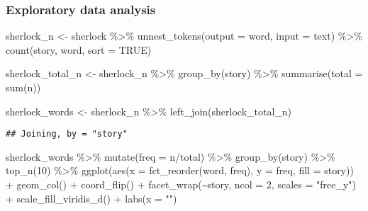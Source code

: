\documentclass[
]{book}
\newenvironment{Shaded}{\begin{snugshade}}{\end{snugshade}}
\newcommand{\AttributeTok}[1]{\textcolor[rgb]{0.77,0.63,0.00}{#1}}
\newcommand{\ConstantTok}[1]{\textcolor[rgb]{0.00,0.00,0.00}{#1}}
\newcommand{\DecValTok}[1]{\textcolor[rgb]{0.00,0.00,0.81}{#1}}
\newcommand{\FunctionTok}[1]{\textcolor[rgb]{0.00,0.00,0.00}{#1}}
\newcommand{\NormalTok}[1]{#1}
\newcommand{\OtherTok}[1]{\textcolor[rgb]{0.56,0.35,0.01}{#1}}
\newcommand{\SpecialCharTok}[1]{\textcolor[rgb]{0.00,0.00,0.00}{#1}}
\newcommand{\StringTok}[1]{\textcolor[rgb]{0.31,0.60,0.02}{#1}}
\begin{document}
\hypertarget{exploratory-data-analysis}{%
\subsubsection{Exploratory data analysis}\label{exploratory-data-analysis}}

\begin{Shaded}
\begin{Highlighting}[]
\NormalTok{sherlock\_n }\OtherTok{\textless{}{-}}\NormalTok{ sherlock }\SpecialCharTok{\%\textgreater{}\%}
  \FunctionTok{unnest\_tokens}\NormalTok{(}\AttributeTok{output =}\NormalTok{ word,}
                \AttributeTok{input =}\NormalTok{ text) }\SpecialCharTok{\%\textgreater{}\%}
  \FunctionTok{count}\NormalTok{(story, word, }\AttributeTok{sort =} \ConstantTok{TRUE}\NormalTok{)}

\NormalTok{sherlock\_total\_n }\OtherTok{\textless{}{-}}\NormalTok{ sherlock\_n }\SpecialCharTok{\%\textgreater{}\%}
  \FunctionTok{group\_by}\NormalTok{(story) }\SpecialCharTok{\%\textgreater{}\%}
  \FunctionTok{summarise}\NormalTok{(}\AttributeTok{total =} \FunctionTok{sum}\NormalTok{(n))}

\NormalTok{sherlock\_words }\OtherTok{\textless{}{-}}\NormalTok{ sherlock\_n }\SpecialCharTok{\%\textgreater{}\%} \FunctionTok{left\_join}\NormalTok{(sherlock\_total\_n)}
\end{Highlighting}
\end{Shaded}

\begin{verbatim}
## Joining, by = "story"
\end{verbatim}

\begin{Shaded}
\begin{Highlighting}[]
\NormalTok{sherlock\_words }\SpecialCharTok{\%\textgreater{}\%}
  \FunctionTok{mutate}\NormalTok{(}\AttributeTok{freq =}\NormalTok{ n}\SpecialCharTok{/}\NormalTok{total) }\SpecialCharTok{\%\textgreater{}\%}
  \FunctionTok{group\_by}\NormalTok{(story) }\SpecialCharTok{\%\textgreater{}\%}
  \FunctionTok{top\_n}\NormalTok{(}\DecValTok{10}\NormalTok{) }\SpecialCharTok{\%\textgreater{}\%}
  \FunctionTok{ggplot}\NormalTok{(}\FunctionTok{aes}\NormalTok{(}\AttributeTok{x =} \FunctionTok{fct\_reorder}\NormalTok{(word, freq), }
             \AttributeTok{y =}\NormalTok{ freq, }
             \AttributeTok{fill =}\NormalTok{ story)) }\SpecialCharTok{+}
  \FunctionTok{geom\_col}\NormalTok{() }\SpecialCharTok{+}
  \FunctionTok{coord\_flip}\NormalTok{() }\SpecialCharTok{+}
  \FunctionTok{facet\_wrap}\NormalTok{(}\SpecialCharTok{\textasciitilde{}}\NormalTok{story, }
             \AttributeTok{ncol =} \DecValTok{2}\NormalTok{, }
             \AttributeTok{scales =} \StringTok{"free\_y"}\NormalTok{) }\SpecialCharTok{+}
  \FunctionTok{scale\_fill\_viridis\_d}\NormalTok{() }\SpecialCharTok{+}
  \FunctionTok{labs}\NormalTok{(}\AttributeTok{x =} \StringTok{""}\NormalTok{)}
\end{Highlighting}
\end{Shaded}
\end{document}
